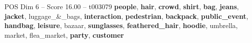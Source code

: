 \begin{textsample}{POS Dim 6 – Score 16.00 – t003079}  \label{ex:f6_pos_016}
\textbf{people}, \textbf{hair}, \textbf{crowd}, \textbf{shirt}, \textbf{bag}, \textbf{jeans}, \textbf{jacket}, luggage\_\&\_bags, \textbf{interaction}, \textbf{pedestrian}, \textbf{backpack}, \textbf{public\_event}, \textbf{handbag}, \textbf{leisure}, bazaar, \textbf{sunglasses}, \textbf{feathered\_hair}, \textbf{hoodie}, umbrella, market, flea\_market, \textbf{party}, \textbf{customer}

\end{textsample}
